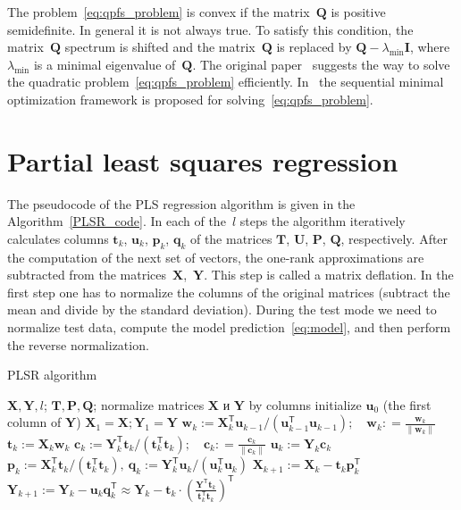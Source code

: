 \documentclass[12pt,twoside]{article}
\theoremstyle{definition}
\newcommand{\bw}{\mathbf{w}}
\newcommand{\bY}{\mathbf{Y}}
\newcommand{\bX}{\mathbf{X}}
\newcommand{\bu}{\mathbf{u}}
\newcommand{\bt}{\mathbf{t}}
\newcommand{\bp}{\mathbf{p}}
\newcommand{\bq}{\mathbf{q}}
\newcommand{\bc}{\mathbf{c}}
\newcommand{\bP}{\mathbf{P}}
\newcommand{\bT}{\mathbf{T}}
\newcommand{\bQ}{\mathbf{Q}}
\newcommand{\bU}{\mathbf{U}}
\newcommand{\T}{\mathsf{T}}
\begin{document}
The problem~\eqref{eq:qpfs_problem} is convex if the matrix~$\bQ$ is positive semidefinite. In general it is not always true.
To satisfy this condition, the matrix~$\bQ$ spectrum is shifted and the matrix~$\bQ$ is replaced by $\bQ - \lambda_{\text{min}} \mathbf{I}$, where $\lambda_{\text{min}} $ is a minimal eigenvalue of~$\bQ$.
The original paper~\cite{rodriguez2010quadratic} suggests the way to solve the quadratic problem~\eqref{eq:qpfs_problem} efficiently. In~\cite{prasad2013scaling} the sequential minimal optimization framework is proposed for solving~\eqref{eq:qpfs_problem}.

\section{Partial least squares regression}
\label{sec:pls}

The pseudocode of the PLS regression algorithm is given in the Algorithm~\ref{PLSR_code}.
In each of the~$l$ steps the algorithm iteratively calculates columns $\bt_k$, $\bu_k$, $\bp_k$, $\bq_k$ of the matrices $\bT$, $\bU$, $\bP$, $\bQ$, respectively. 
After the computation of the next set of vectors, the one-rank approximations are subtracted from the matrices~$\bX$,~$\bY$. 
This step is called a matrix deflation.
In the first step one has to normalize the columns of the original matrices (subtract the mean and divide by the standard deviation).
During the test mode we need to normalize test data, compute the model prediction~\eqref{eq:model}, and then perform the reverse normalization.

\begin{algorithm}[h]
	\caption{PLSR algorithm}
	\label{PLSR_code}
	\begin{algorithmic}[1]
		\REQUIRE $\bX, \bY, l$;
		\ENSURE $\bT, \bP, \bQ$;
		\STATE normalize matrices $\bX$ и $\bY$ by columns
		\STATE initialize $\bu_0$ (the first column of $\bY$)
		\STATE $\bX_1 = \bX; \bY_1 = \bY$
		\REPEAT
		\vspace{0.1cm}
		\STATE $\bw_k := \bX_k^{\T} \bu_{k-1} / (\bu_{k-1}^{\T} \bu_{k-1}); \quad \bw_k: = \frac{\bw_k}{\| \bw_k \|}$
		\vspace{0.1cm}
		\STATE $\bt_k := \bX_k \bw_k$
		\vspace{0.1cm}
		\STATE $\bc_k := \bY_k^{\T} \bt_k / (\bt_k^{\T} \bt_k); \quad \bc_k: = \frac{\bc_k}{\| \bc_k \|}$
		\vspace{0.1cm}
		\STATE $\bu_k := \bY_k \bc_k$
		\UNTIL{$\bt_k$ stabilizes}
		\vspace{0.1cm}
		\STATE $\bp_k:= \bX_k^{\T}\bt_k/(\bt_k^{\T}\bt_k),\ 
		\bq_k := \bY_k^{\T}\bu_k/(\bu_k^{\T}\bu_k)$
		\vspace{0.2cm}
		\STATE $\bX_{k+1} :=  \bX_k - \bt_k \bp_k^{\T}$
		\vspace{0.2cm}
		\STATE $\bY_{k + 1} :=  \bY_k - \bu_k \bq_k^{\T} \approx  \bY_k - \bt_k \cdot \left(\frac{\bY^{\T}\bt_k}{\bt_k^{\T}\bt_k}\right)^{\T} $ 
		\ENDFOR
	\end{algorithmic}
\end{algorithm}
\end{document}
